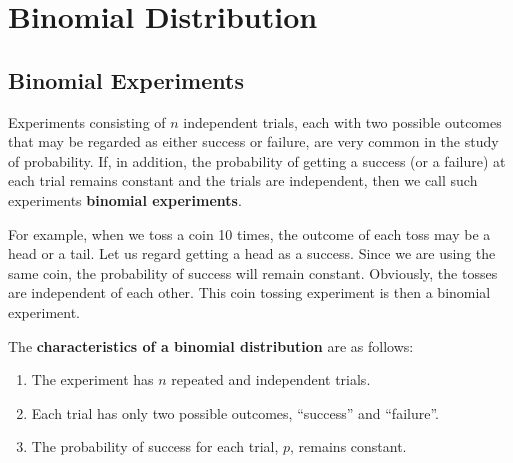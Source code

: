 \documentclass[11pt,a4paper]{book}
\begin{document}
\chapter{Binomial Distribution}

\section{Binomial Experiments}

Experiments consisting of $n$ independent trials, each with two possible outcomes that may be regarded as either success or failure, are very common in the study of probability. If, in addition, the probability of getting a success (or a failure) at each trial remains constant and the trials are independent, then we call such experiments \textbf{binomial experiments}.

For example, when we toss a coin 10 times, the outcome of each toss may be a head or a tail. Let us regard getting a head as a success. Since we are using the same coin, the probability of success will remain constant. Obviously, the tosses are independent of each other. This coin tossing experiment is then a binomial experiment.

\begin{tcolorbox}[colback=blue!5, colframe=black, boxrule=.4pt, sharpish corners]

The \textbf{characteristics of a binomial distribution} are as follows:

\begin{enumerate}[leftmargin=2cm]

\item  The experiment has $n$ repeated and independent trials.

\item  Each trial has only two possible outcomes, ``success'' and
``failure''.

\item  The probability of success for each trial, $p$, remains
constant.

\end{enumerate}
\end{tcolorbox}
\end{document}
